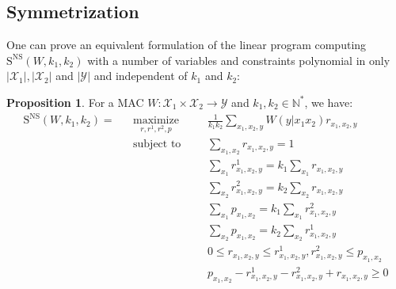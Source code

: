 \documentclass[11pt]{article}
\theoremstyle{definition}
\newtheorem{prop}[theo]{Proposition}
\theoremstyle{remark}
\DeclareMathOperator{\maxi}{\text{maximize}}
\DeclareMathOperator{\st}{\text{subject to}}
\begin{document}
\subsection{Symmetrization}
One can prove an equivalent formulation of the linear program computing $\mathrm{S}^{\mathrm{NS}}(W,k_1,k_2)$ with a number of variables and constraints polynomial in only $|\mathcal{X}_1|,|\mathcal{X}_2|$ and $|\mathcal{Y}|$ and independent of $k_1$ and $k_2$:
\begin{prop}
  \label{prop:NSLP}
  For a MAC $W: \mathcal{X}_1 \times \mathcal{X}_2 \rightarrow \mathcal{Y}$ and $k_1,k_2 \in \mathbb{N}^*$, we have:
  \begin{equation}
  \begin{aligned}
    \mathrm{S}^{\mathrm{NS}}(W,k_1,k_2) = &&\underset{r,r^1,r^2,p}{\maxi} &&& \frac{1}{k_1k_2} \sum_{x_1,x_2,y} W(y|x_1x_2)r_{x_1,x_2,y}\\
    &&\st &&& \sum_{x_1,x_2} r_{x_1,x_2,y} = 1\\
    &&&&& \sum_{x_1} r^1_{x_1,x_2,y} = k_1 \sum_{x_1} r_{x_1,x_2,y}\\
    &&&&& \sum_{x_2} r^2_{x_1,x_2,y} = k_2 \sum_{x_2} r_{x_1,x_2,y}\\
    &&&&& \sum_{x_1} p_{x_1,x_2} = k_1 \sum_{x_1} r^2_{x_1,x_2,y}\\
    &&&&& \sum_{x_2} p_{x_1,x_2} = k_2 \sum_{x_2} r^1_{x_1,x_2,y}\\
    &&&&& 0 \leq r_{x_1,x_2,y} \leq r^1_{x_1,x_2,y},r^2_{x_1,x_2,y} \leq p_{x_1,x_2}\\
    &&&&& p_{x_1,x_2} -  r^1_{x_1,x_2,y} - r^2_{x_1,x_2,y} + r_{x_1,x_2,y} \geq 0
  \end{aligned}
  \end{equation}

\end{prop}
\end{document}

